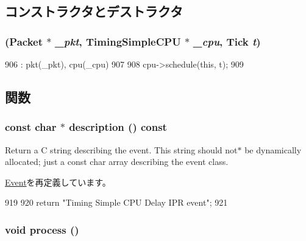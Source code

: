 \subsection{コンストラクタとデストラクタ}
\hypertarget{structTimingSimpleCPU_1_1IprEvent_aec0e2beb27dc27f4f34d1b8cc050b44f}{
\subsubsection[{IprEvent}]{ ({\bf Packet} $\ast$ {\em \_\-pkt}, \/  {\bf TimingSimpleCPU} $\ast$ {\em \_\-cpu}, \/  {\bf Tick} {\em t})}}
\label{structTimingSimpleCPU_1_1IprEvent_aec0e2beb27dc27f4f34d1b8cc050b44f}



\begin{DoxyCode}
906     : pkt(_pkt), cpu(_cpu)
907 {
908     cpu->schedule(this, t);
909 }
\end{DoxyCode}


\subsection{関数}
\hypertarget{structTimingSimpleCPU_1_1IprEvent_a5a14fe478e2393ff51f02e9b7be27e00}{
\subsubsection[{description}]{\setlength{\rightskip}{0pt plus 5cm}const char $\ast$ description () const}}
\label{structTimingSimpleCPU_1_1IprEvent_a5a14fe478e2393ff51f02e9b7be27e00}
Return a C string describing the event. This string should not$\ast$ be dynamically allocated; just a const char array describing the event class. 

\hyperlink{classEvent_a130ddddf003422b413e2e891b1b80e8f}{Event}を再定義しています。


\begin{DoxyCode}
919 {
920     return "Timing Simple CPU Delay IPR event";
921 }
\end{DoxyCode}
\hypertarget{structTimingSimpleCPU_1_1IprEvent_a2e9c5136d19b1a95fc427e0852deab5c}{
\subsubsection[{process}]{\setlength{\rightskip}{0pt plus 5cm}void process ()}}
\label{structTimingSimpleCPU_1_1IprEvent_a2e9c5136d19b1a95fc427e0852deab5c}


